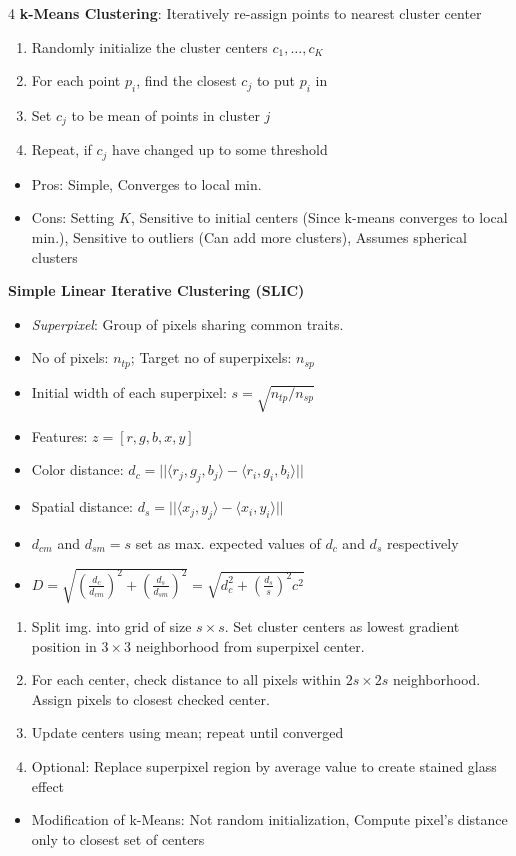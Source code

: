 \documentclass[10pt]{extarticle}
\begin{document}
\begin{multicols}{4}
\textbf{k-Means Clustering}: Iteratively re-assign points to nearest cluster center
\begin{enumerate}
    \item Randomly initialize the cluster centers $c_1, \ldots, c_K$
    \item For each point $p_i$, find the closest $c_j$ to put $p_i$ in
    \item Set $c_j$ to be mean of points in cluster $j$
    \item Repeat, if $c_j$ have changed up to some threshold
\end{enumerate}
\begin{itemize}
    \item Pros: Simple, Converges to local min.
    \item Cons: Setting $K$, Sensitive to initial centers (Since k-means converges to local min.), Sensitive to outliers (Can add more clusters), Assumes spherical clusters
\end{itemize}
\textbf{Simple Linear Iterative Clustering (SLIC)}
\begin{itemize}
    \item \textit{Superpixel}: Group of pixels sharing common traits.
    \item No of pixels: $n_{tp}$; Target no of superpixels: $n_{sp}$
    \item Initial width of each superpixel: $s = \sqrt{n_{tp} / n_{sp}}$
    \item Features: $z = [r,g,b,x,y]$
    \item Color distance: $d_c = || \langle r_j,g_j,b_j \rangle - \langle r_i,g_i,b_i \rangle ||$
    \item Spatial distance: $d_s = || \langle x_j,y_j \rangle - \langle x_i,y_i \rangle ||$
    \item $d_{cm}$ and $d_{sm}=s$ set as max. expected values of $d_c$ and $d_s$ respectively
    \item $D = \sqrt{(\frac{d_c}{d_{cm}})^2+(\frac{d_s}{d_{sm}})^2} = \sqrt{d_c^2 + (\frac{d_s}{s})^2 c^2}$
\end{itemize}
\begin{enumerate}
    \item Split img. into grid of size $s \times s$. Set cluster centers as lowest gradient position in $3 \times 3$ neighborhood from superpixel center. 
    \item For each center, check distance to all pixels within $2s \times 2s$ neighborhood. Assign pixels to closest checked center.
    \item Update centers using mean; repeat until converged
    \item Optional: Replace superpixel region by average value to create stained glass effect
\end{enumerate}
\begin{itemize}
    \item Modification of k-Means: Not random initialization, Compute pixel's distance only to closest set of centers
\end{itemize}

\end{multicols}
\end{document}
